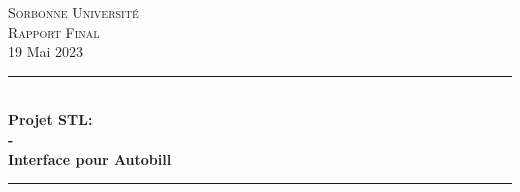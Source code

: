 \documentclass[12pt]{article}
\begin{document}
\newcommand{\HRule}{\rule{\linewidth}{0.5mm}}


\begin{titlepage}
      \center %



      \textsc{\LARGE Sorbonne Université}\\[1.5cm] %
      \textsc{\Large Rapport Final}\\[0.5cm] %
      {\large 19 Mai 2023}\\ %



      \vspace{2cm}
      \HRule \\[0.4cm]
      { \huge \bfseries Projet STL: \\ - \\ Interface pour Autobill}\\[0.7cm] %
      \HRule \\[1cm]




\end{titlepage}
\end{document}
